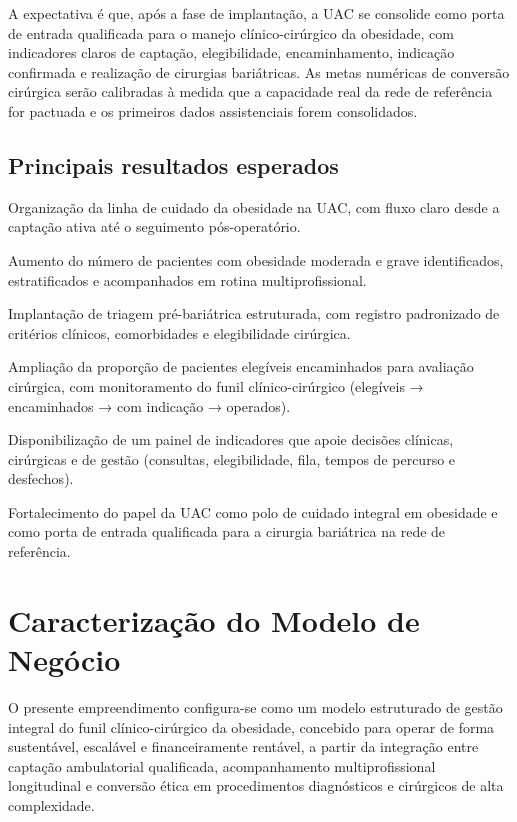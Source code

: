 \documentclass[12pt]{article}
\begin{document}
A expectativa é que, após a fase de implantação, a UAC se consolide como porta de entrada qualificada para o manejo clínico-cirúrgico da obesidade, com indicadores claros de captação, elegibilidade, encaminhamento, indicação confirmada e realização de cirurgias bariátricas. As metas numéricas de conversão cirúrgica serão calibradas à medida que a capacidade real da rede de referência for pactuada e os primeiros dados assistenciais forem consolidados.

\subsection{Principais resultados esperados}
\label{sec:orge20f1dc}
\begin{hleveltwo}
\item Organização da linha de cuidado da obesidade na UAC, com fluxo claro desde a captação ativa até o seguimento pós-operatório.
\item Aumento do número de pacientes com obesidade moderada e grave identificados, estratificados e acompanhados em rotina multiprofissional.
\item Implantação de triagem pré-bariátrica estruturada, com registro padronizado de critérios clínicos, comorbidades e elegibilidade cirúrgica.
\item Ampliação da proporção de pacientes elegíveis encaminhados para avaliação cirúrgica, com monitoramento do funil clínico-cirúrgico (elegíveis → encaminhados → com indicação → operados).
\item Disponibilização de um painel de indicadores que apoie decisões clínicas, cirúrgicas e de gestão (consultas, elegibilidade, fila, tempos de percurso e desfechos).
\item Fortalecimento do papel da UAC como polo de cuidado integral em obesidade e como porta de entrada qualificada para a cirurgia bariátrica na rede de referência.
\end{hleveltwo}

\FGVNewPage

\section{Caracterização do Modelo de Negócio}
\label{sec:orgd6ca12c}
O presente empreendimento configura-se como um modelo estruturado de gestão integral do funil clínico-cirúrgico da obesidade, concebido para operar de forma sustentável, escalável e financeiramente rentável, a partir da integração entre captação ambulatorial qualificada, acompanhamento multiprofissional longitudinal e conversão ética em procedimentos diagnósticos e cirúrgicos de alta complexidade.
\end{document}
